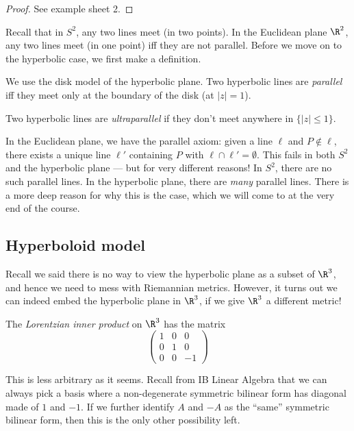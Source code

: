 \documentclass[a4paper]{article}
\begin{document}
\begin{proof}
  See example sheet 2.
\end{proof}

Recall that in $S^2$, any two lines meet (in two points). In the Euclidean plane $\R^2$, any two lines meet (in one point) iff they are not parallel. Before we move on to the hyperbolic case, we first make a definition.

\begin{defi}
  We use the disk model of the hyperbolic plane. Two hyperbolic lines are \emph{parallel} iff they meet only at the boundary of the disk (at $|z| = 1$).
\end{defi}

\begin{defi}
  Two hyperbolic lines are \emph{ultraparallel} if they don't meet anywhere in $\{|z| \leq 1\}$.
\end{defi}

In the Euclidean plane, we have the parallel axiom: given a line $\ell$ and $P \not\in \ell$, there exists a unique line $\ell'$ containing $P$ with $\ell \cap \ell' = \emptyset$. This fails in both $S^2$ and the hyperbolic plane --- but for very different reasons! In $S^2$, there are no such parallel lines. In the hyperbolic plane, there are \emph{many} parallel lines. There is a more deep reason for why this is the case, which we will come to at the very end of the course.

\subsection{Hyperboloid model}
Recall we said there is no way to view the hyperbolic plane as a subset of $\R^3$, and hence we need to mess with Riemannian metrics. However, it turns out we can indeed embed the hyperbolic plane in $\R^3$, if we give $\R^3$ a different metric!

\begin{defi}
  The \emph{Lorentzian inner product} on $\R^3$ has the matrix
  \[
    \begin{pmatrix}
      1 & 0 & 0\\
      0 & 1 & 0\\
      0 & 0 & -1
    \end{pmatrix}
  \]
\end{defi}
This is less arbitrary as it seems. Recall from IB Linear Algebra that we can always pick a basis where a non-degenerate symmetric bilinear form has diagonal made of $1$ and $-1$. If we further identify $A$ and $-A$ as the ``same'' symmetric bilinear form, then this is the only other possibility left.
\end{document}

